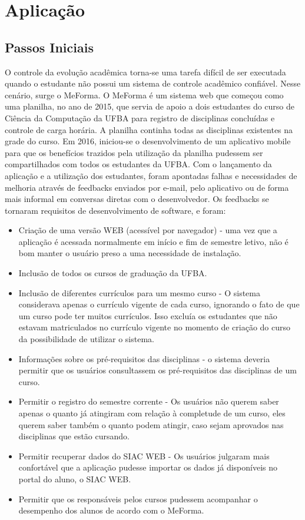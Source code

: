 \chapter{Aplicação}
\section{Passos Iniciais}
O controle da evolução acadêmica torna-se uma tarefa difícil de ser executada quando o estudante não possui um sistema de controle acadêmico confiável. Nesse cenário, surge o MeForma. O MeForma é um sistema web que começou como uma planilha, no ano de 2015, que servia de apoio a dois estudantes do curso de Ciência da Computação da UFBA para registro de disciplinas concluídas e controle de carga horária. A planilha continha todas as disciplinas existentes na grade do curso. Em 2016, iniciou-se o desenvolvimento de um aplicativo mobile para que os benefícios trazidos pela utilização da planilha pudessem ser compartilhados com todos os estudantes da UFBA. Com o lançamento da aplicação e a utilização dos estudantes, foram apontadas falhas e necessidades de melhoria através de feedbacks enviados por e-mail, pelo aplicativo ou de forma mais informal em conversas diretas com o desenvolvedor.
Os feedbacks se tornaram requisitos de desenvolvimento de software, e foram:
\begin{itemize}
\item Criação de uma versão WEB (acessível por navegador) - uma vez que a aplicação é acessada normalmente em início e fim de semestre letivo, não é bom manter o usuário preso a uma necessidade de instalação.
\item Inclusão de todos os cursos de graduação da UFBA.
\item Inclusão de diferentes currículos para um mesmo curso - O sistema considerava apenas o currículo vigente de cada curso, ignorando o fato de que um curso pode ter muitos currículos. Isso excluía os estudantes que não estavam matriculados no currículo vigente no momento de criação do curso da possibilidade de utilizar o sistema.
\item Informações sobre os pré-requisitos das disciplinas - o sistema deveria permitir que os usuários consultassem os pré-requisitos das disciplinas de um curso.
\item Permitir o registro do semestre corrente - Os usuários não querem saber apenas o quanto já atingiram com relação à completude de um curso, eles querem saber também o quanto podem atingir, caso sejam aprovados nas disciplinas que estão cursando.
\item Permitir recuperar dados do SIAC WEB - Os usuários julgaram mais confortável que a aplicação pudesse importar os dados já disponíveis no portal do aluno, o SIAC WEB.
\item Permitir que os responsáveis pelos cursos pudessem acompanhar o desempenho dos alunos de acordo com o MeForma.
\end{itemize}

